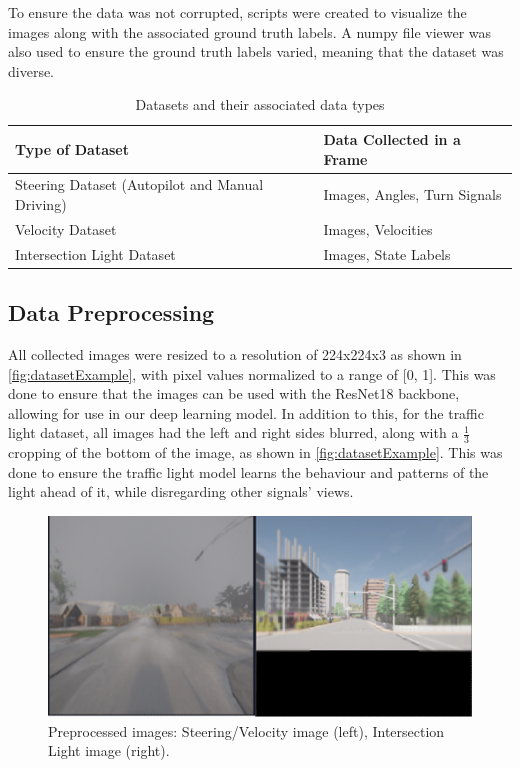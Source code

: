 \documentclass{article} %
\begin{document}
To ensure the data was not corrupted, scripts were created to visualize the images along with the associated ground truth labels. A numpy file viewer was also used to ensure the ground truth labels varied, meaning that the dataset was diverse.

\begin{table}[h]
\centering
\caption{Datasets and their associated data types}
\vspace{0.5em}
\begin{tabular}{|p{5cm}|p{7cm}|}
\hline
\textbf{Type of Dataset} & \textbf{Data Collected in a Frame} \\ \hline
Steering Dataset (Autopilot and Manual Driving) & Images, Angles, Turn Signals \\ \hline
Velocity Dataset & Images, Velocities \\ \hline
Intersection Light Dataset & Images, State Labels \\ \hline
\end{tabular}
\end{table}

\subsection{Data Preprocessing}

All collected images were resized to a resolution of 224x224x3 as shown in \autoref{fig:datasetExample}, with pixel values normalized to a range of [0, 1].
This was done to ensure that the images can be used with the ResNet18 backbone, allowing for use in our deep learning model. In addition to this, for the traffic light dataset, all images had the left and right sides blurred, along with a \(\frac{1}{3}\) cropping of the bottom of the image, as shown in \autoref{fig:datasetExample}. This was done to ensure the traffic light model learns the behaviour and patterns of the light ahead of it, while disregarding other signals' views.

\begin{figure}[H] %
    \centering
    \includegraphics[width=1.0\textwidth]{example of images in dataset.png} %
    \caption{Preprocessed images: Steering/Velocity image (left), Intersection Light image (right).}
    \label{fig:datasetExample}
\end{figure}
\end{document}
